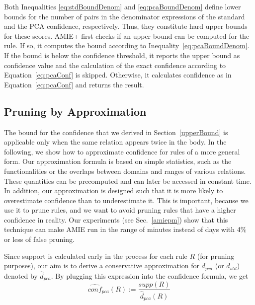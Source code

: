 {Both Inequalities \ref{eq:stdBoundDenom} and \ref{eq:pcaBoundDenom}
define lower bounds for the number of pairs in the denominator expressions of the standard
and the PCA confidence, respectively. Thus, they constitute hard upper bounds for these scores.
AMIE+ first checks if an upper bound can be computed for the rule. If so, it computes the bound according to Inequality~\ref{eq:pcaBoundDenom}.
If the bound is below the confidence threshold, it reports the upper bound as confidence value and the calculation of the exact confidence according to Equation~\ref{eq:pcaConf} is skipped.
Otherwise, it calculates confidence as in Equation~\ref{eq:pcaConf} and returns the result.


\subsection{Pruning by Approximation}
\label{subsec:pruningbyapprox}


The bound for the confidence that we derived in Section~\ref{upperBound} is applicable only when the same relation appears twice in the body.
In the following, we show how to approximate confidence for rules of a more general form.
Our approximation formula is based on simple statistics, such as the functionalities or the overlaps between domains and ranges of various relations. These quantities
can be precomputed and can later be accessed in constant time. In addition, our approximation is designed such that it is more likely to overestimate confidence than to underestimate it.
This is important, because we use it to prune rules, and we want to avoid pruning rules that have a higher confidence in reality.
Our experiments (see Sec.~\ref{amiepm}) show that this technique can make AMIE run in the range of minutes instead of days with 4\% or less of false pruning.

Since support is calculated early in the process for each rule $R$ (for pruning purposes),
our aim is to derive a conservative approximation for $d_{pca}$ (or $d_{std}$) denoted by
$\widehat{d}_{pca}$. By plugging this expression into the confidence formula, we get
\begin{equation} \label{eq:pcaApproxConf}
  \widehat{conf}_{pca}(R):=\frac{supp(R)}{\widehat{d}_{pca}(R)}
\end{equation}

}
